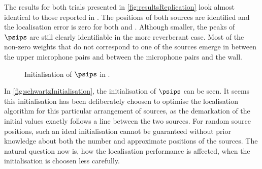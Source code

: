 The results for both trials presented in \autoref{fig:resultsReplication} look almost identical to those reported in \cite{Schwartz2014}. The positions of both sources are identified and the localisation error is zero for both  and . Although smaller, the peaks of $\psips$ are still clearly identifiable in the more reverberant case. Most of the non-zero weights that do not correspond to one of the sources emerge in between the upper microphone pairs and between the microphone pairs and the wall. 

\begin{figure}[!htbp]
	\iftoggle{nice}{%
		\texttt{[image: plots/schwartz2014/s=2-sloc=schwartz2014-T60=0.4-prior=schwartz2014-overview-sc]}
	}{%
		\setlength{\figurewidth}{\textwidth}
		\setlength{\figureheight}{0.3\textheight}
		
	}
    \caption[Initialisation of $\psips$ in \cite{Schwartz2014}]{Initialisation of $\psips$ in \cite{Schwartz2014}.}
    \label{fig:schwartzInitialisation}
\end{figure}

%		

\FloatBarrier

In \autoref{fig:schwartzInitialisation}, the initialisation of $\psips$ can be seen. It seems this initialisation has been deliberately choosen to optimise the localisation algorithm for this particular arrangement of sources, as the demarkation of the initial values exactly follows a line between the two sources. For random source positions, such an ideal initialisation cannot be guaranteed without prior knowledge about both the number and approximate positions of the sources. The natural question now is, how the localisation performance is affected, when the initialisation is choosen less carefully.